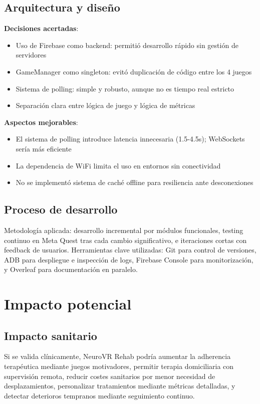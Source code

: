 \subsection{Arquitectura y diseño}

\textbf{Decisiones acertadas}:
\begin{itemize}
    \item Uso de Firebase como backend: permitió desarrollo rápido sin gestión de servidores
    \item GameManager como singleton: evitó duplicación de código entre los 4 juegos
    \item Sistema de polling: simple y robusto, aunque no es tiempo real estricto
    \item Separación clara entre lógica de juego y lógica de métricas
\end{itemize}

\textbf{Aspectos mejorables}:
\begin{itemize}
    \item El sistema de polling introduce latencia innecesaria (1.5-4.5s); WebSockets sería más eficiente
    \item La dependencia de WiFi limita el uso en entornos sin conectividad
    \item No se implementó sistema de caché offline para resiliencia ante desconexiones
\end{itemize}

\subsection{Proceso de desarrollo}

Metodología aplicada: desarrollo incremental por módulos funcionales, testing continuo en Meta Quest tras cada cambio significativo, e iteraciones cortas con feedback de usuarios. Herramientas clave utilizadas: Git para control de versiones, ADB para despliegue e inspección de logs, Firebase Console para monitorización, y Overleaf para documentación en paralelo.

\section{Impacto potencial}

\subsection{Impacto sanitario}

Si se valida clínicamente, NeuroVR Rehab podría aumentar la adherencia terapéutica mediante juegos motivadores, permitir terapia domiciliaria con supervisión remota, reducir costes sanitarios por menor necesidad de desplazamientos, personalizar tratamientos mediante métricas detalladas, y detectar deterioros tempranos mediante seguimiento continuo.

